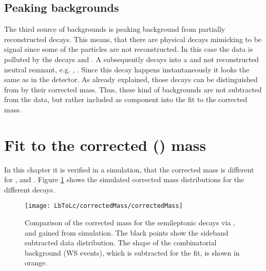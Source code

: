 \subsection{Peaking backgrounds}
The third source of backgrounds is peaking background from partially reconstructed decays.
This means, that there are physical decays mimicking to be signal since some of the particles are not reconstructed.
In this case the \LbToLcmunu data is polluted by the decays  and  \cite{SL_Vub}.
A \Lcstar subsequently decays into a \Lc and not reconstructed neutral remnant, e.g. \piz, \pip\pim.
Since this decay happens instantaneously it looks the same as \LcTopKpi in the detector.
As already explained, those decays can be distinguished from \LbToLcmunu by their corrected \Lb mass.
Thus, these kind of backgrounds are not subtracted from the data, but rather included as component into the fit to the corrected \Lb mass.

\section{Fit to the corrected \pKpi\mun (\Lb) mass}
\label{sec:FitCorrectedMass}
In this chapter it is verified in a simulation, that the corrected \pKpi\mun mass is different for \LbToLcmunu,  and .
Figure \ref{fig:correctedMass_normalisation} shows the simulated corrected \pKpi\mun mass distributions for the different decays.
\begin{figure}[tb]
	\centering
	\texttt{[image: LbToLc/correctedMass/correctedMass]}
	\caption{Comparison of the \pKpi\mun corrected mass for the semileptonic \Lb decays via \Lc,  and  gained from simulation. The black points show the sideband subtracted data distribution. The shape of the combinatorial \Lc\mun background (WS events), which is
    subtracted for the fit, is shown in orange.}
	\label{fig:correctedMass_normalisation}
\end{figure}

